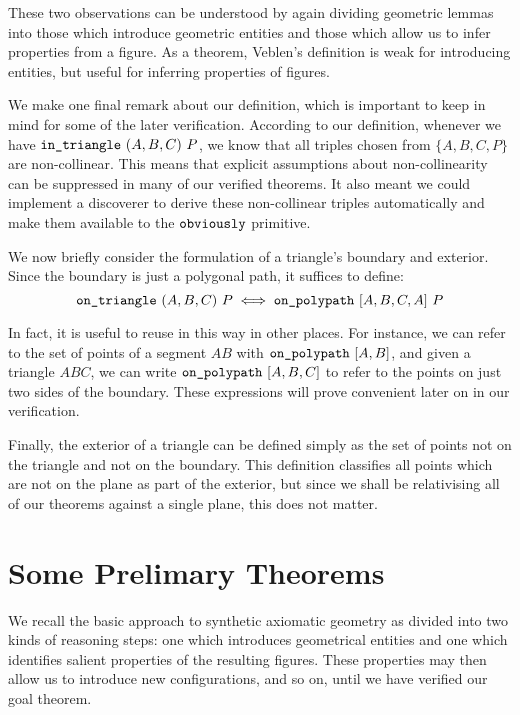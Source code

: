 These two observations can be understood by again dividing geometric lemmas into those which introduce geometric entities and those which allow us to infer properties from a figure. As a theorem, Veblen's definition is weak for introducing entities, but useful for inferring properties of figures.

We make one final remark about our definition, which is important to keep in mind for some of the later verification. According to our definition, whenever we have $\texttt{in\_triangle}\ (A,B,C)\ P$, we know that all triples chosen from $\{A,B,C,P\}$ are non-collinear. This means that explicit assumptions about non-collinearity can be suppressed in many of our verified theorems. It also meant we could implement a discoverer  to derive these non-collinear triples automatically and make them available to the $\texttt{obviously}$ primitive. 

We now briefly consider the formulation of a triangle's boundary and exterior. Since the boundary is just a polygonal path, it suffices to define:
\begin{equation}\label{eq:onTriangleDef}
\code{on\_triangle}\ (A,B,C)\ P \iff \code{on\_polypath}\ [A,B,C,A]\ P
\end{equation}

In fact, it is useful to reuse  in this way in other places. For instance, we can refer to the set of points of a segment $AB$ with $\texttt{on\_polypath}\ [A,B]$, and given a triangle $ABC$, we can write $\code{on\_polypath}\ [A,B,C]$ to refer to the points on just two sides of the boundary. These expressions will prove convenient later on in our verification.

Finally, the exterior of a triangle can be defined simply as the set of points not on the triangle and not on the boundary. This definition classifies all points which are not on the plane as part of the exterior, but since we shall be relativising all of our theorems against a single plane, this does not matter.

\section{Some Prelimary Theorems}
We recall the basic approach to synthetic axiomatic geometry as divided into two kinds of reasoning steps: one which introduces geometrical entities and one which identifies salient properties of the resulting figures. These properties may then allow us to introduce new configurations, and so on, until we have verified our goal theorem. 

